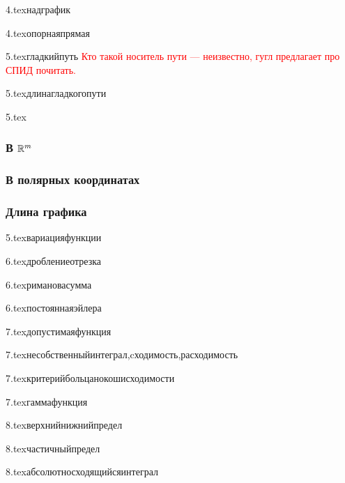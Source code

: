 {4.tex}{надграфик}

{4.tex}{опорнаяпрямая}

{5.tex}{гладкийпуть}
\textcolor{red}{Кто такой носитель пути --- неизвестно, гугл предлагает про СПИД почитать.}

{5.tex}{длинагладкогопути}

{5.tex}{}
\subsubsection{В $\mathbb{R}^m$}
\subsubsection{В полярных координатах}
\subsubsection{Длина графика}

{5.tex}{вариацияфункции}

{6.tex}{дроблениеотрезка}

{6.tex}{римановасумма}

{6.tex}{постояннаяэйлера}

{7.tex}{допустимаяфункция}

{7.tex}{несобственныйинтеграл,cходимость,расходимость}

{7.tex}{критерийбольцанокошисходимости}

{7.tex}{гаммафункция}

{8.tex}{верхнийнижнийпредел}

{8.tex}{частичныйпредел}

{8.tex}{абсолютносходящийсяинтеграл}

